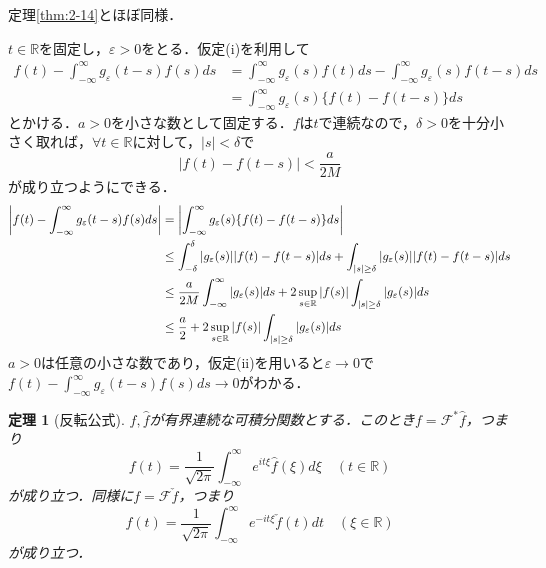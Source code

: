 \documentclass[dvipdfmx,a4j,10pt]{jsarticle}
\makeatletter
\theoremstyle{mystyle1}
\newtheorem{theorem}{定理}[section]
\theoremstyle{mystyle3}
\theoremstyle{mystyle4}
\theoremstyle{mystyle6}
\theoremstyle{mystyle2}
\theoremstyle{mystyle5}
\renewenvironment{proof}[1][\proofname]{\par
  \pushQED{\qed}%
  \normalfont
  \topsep6\p@\@plus6\p@ \trivlist
  \item[\hskip\labelsep{\bfseries\sffamily #1}]\ignorespaces
}{%
  \popQED\endtrivlist\@endpefalse
}
\renewcommand\proofname{証明}
\newenvironment{thm}[1][]
{\begin{tcolorbox}[
    enhanced,
    boxrule=0pt,
    arc=0mm,
    frame hidden,
    borderline west={2pt}{-4pt}{red},
    breakable = true
    ]
    \begin{theorem}[#1]
}
{\end{theorem}\end{tcolorbox}}
\makeatother
\begin{document}
\begin{proof}
	定理\ref{thm:2-14}とほぼ同様．

	$t\in\mathbb{R}$を固定し，$\varepsilon>0$をとる．仮定(i)を利用して
	\[
		\begin{split}
			f(t)-\int_{-\infty}^\infty g_\varepsilon(t-s)f(s)ds
			&=\int_{-\infty}^\infty g_\varepsilon(s)f(t)ds-\int_{-\infty}^\infty g_\varepsilon(s)f(t-s)ds \\
			&=\int_{-\infty}^\infty g_\varepsilon(s)\{f(t)-f(t-s)\}ds
		\end{split}
	\]
	とかける．$a>0$を小さな数として固定する．$f$は$t$で連続なので，$\delta>0$を十分小さく取れば，$\forall t\in\mathbb{R}$に対して，$|s|<\delta$で
	\[
		|f(t)-f(t-s)|<\frac{a}{2M}
	\]
	が成り立つようにできる．
	\[
		\begin{split}
			\mleft|f(t)-\int_{-\infty}^\infty g_\varepsilon(t-s)f(s)ds\mright|
			&=\mleft|\int_{-\infty}^\infty g_\varepsilon(s)\{f(t)-f(t-s)\}ds\mright| \\
			&\leq \int_{-\delta}^\delta |g_\varepsilon(s)||f(t)-f(t-s)|ds+\int_{|s|\geq\delta}|g_\varepsilon(s)||f(t)-f(t-s)|ds \\
			&\leq\frac{a}{2M}\int_{-\infty}^\infty|g_\varepsilon(s)|ds+2\sup_{s\in\mathbb{R}}|f(s)|\int_{|s|\geq\delta}|g_\varepsilon(s)|ds \\
			&\leq\frac{a}{2}+2\sup_{s\in\mathbb{R}}|f(s)|\int_{|s|\geq\delta}|g_\varepsilon(s)|ds
		\end{split}
	\]
	$a>0$は任意の小さな数であり，仮定(ii)を用いると$\varepsilon\to 0$で$f(t)-\int_{-\infty}^\infty g_\varepsilon(t-s)f(s)ds\to 0$がわかる．
\end{proof}

\begin{thm}[反転公式]\label{thm:3-5}
	$f,\hat f$が有界連続な可積分関数とする．このとき$f=\mathcal{F}^*\hat f$，つまり
	\[
		f(t)=\frac{1}{\sqrt{2\pi}}\int_{-\infty}^\infty e^{it\xi}\hat f(\xi)d\xi\quad(t\in\mathbb{R})
	\]
	が成り立つ．同様に$f=\mathcal{F}\check f$，つまり
	\[
		f(t)=\frac{1}{\sqrt{2\pi}}\int_{-\infty}^\infty e^{-it\xi}\check f(t)dt\quad(\xi\in\mathbb{R})
	\]
	が成り立つ．
\end{thm}
\end{document}
